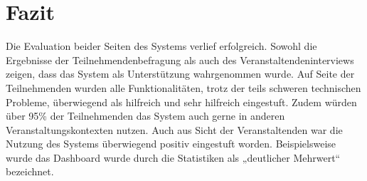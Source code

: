 \section{Fazit}

Die Evaluation beider Seiten des Systems verlief erfolgreich. Sowohl die
Ergebnisse der Teilnehmendenbefragung als auch des Veranstaltendeninterviews
zeigen, dass das System als Unterstützung wahrgenommen wurde. Auf Seite der
Teilnehmenden wurden alle Funktionalitäten, trotz der teils schweren technischen
Probleme, überwiegend als hilfreich und sehr hilfreich eingestuft. Zudem würden
über 95\% der Teilnehmenden das System auch gerne in anderen
Veranstaltungskontexten nutzen. Auch aus Sicht der Veranstaltenden war die
Nutzung des Systems überwiegend positiv eingestuft worden. Beispielsweise wurde
das Dashboard wurde durch die Statistiken als „deutlicher Mehrwert“ bezeichnet.


